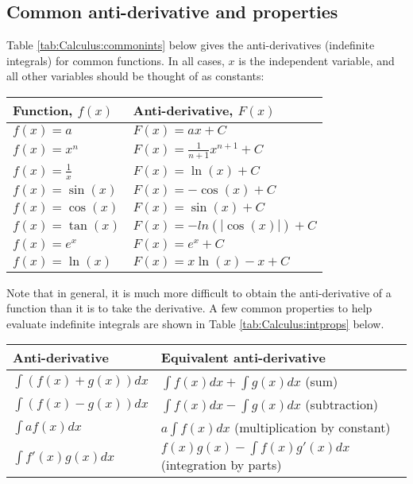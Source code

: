 \subsection{Common anti-derivative and properties}
Table \ref{tab:Calculus:commonints} below gives the anti-derivatives (indefinite integrals) for common functions. In all cases, $x$ is the independent variable, and all other variables should be thought of as constants:
\begin{center}
\begin{tabular}{l l}
\textbf{Function, $f(x)$} & \textbf{Anti-derivative, $F(x)$}\\
\hline\hline
$f(x)=a$ & $F(x)=ax+C$ \\
$f(x)=x^n$ & $F(x)=\frac{1}{n+1}x^{n+1}+C$ \\
$f(x)=\frac{1}{x}$ & $F(x)=\ln(x)+C$ \\
$f(x)=\sin(x)$ & $F(x)=-\cos(x)+C$ \\
$f(x)=\cos(x)$ & $F(x)=\sin(x)+C$ \\
$f(x)=\tan(x)$ & $F(x)=-ln(|\cos(x)|)+C$ \\
$f(x)=e^x$ & $F(x)=e^x+C$ \\
$f(x)=\ln(x)$ & $F(x)=x\ln(x)-x+C$ \\
\hline
\end{tabular}
\end{center}

Note that in general, it is much more difficult to obtain the anti-derivative of a function than it is to take the derivative. A few common properties to help evaluate indefinite integrals are shown in Table \ref{tab:Calculus:intprops} below.
\begin{center}
\begin{tabular}{l l}
\textbf{Anti-derivative} & \textbf{Equivalent anti-derivative}\\
\hline\hline
$\int (f(x)+g(x)) dx$ &$\int f(x)dx+\int g(x) dx$ (sum)\\
$\int (f(x)-g(x)) dx$ &$\int f(x)dx-\int g(x) dx$ (subtraction)\\
$\int af(x) dx$ & $a\int f(x)dx$ (multiplication by constant)\\
$\int f'(x)g(x) dx$ & $f(x)g(x)-\int f(x)g'(x) dx$ (integration by parts)\\
\hline
\end{tabular}
\end{center}

